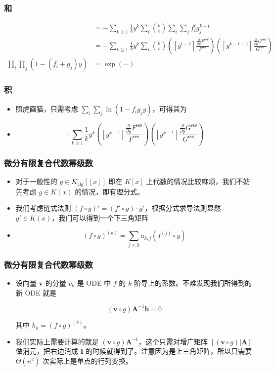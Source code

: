 \documentclass[mathserif]{ctexbeamer}
\begin{document}
\frame
{
  \frametitle{和}
  \begin{align*}
  &= - \sum_{k\ge 1} \frac 1k y^k \sum_t \binom k t  \sum_i\sum_j  f_i^t g_j^{k-t}\\
  &= - \sum_{k\ge 1} \frac 1k y^k \sum_t \binom k t \left([y^{t-1}]\frac {\frac {\partial}{\partial y}F^{\mathsf {rev}}}{F^{\mathsf {rev}}}\right)\left([y^{k-t-1}]\frac {\frac {\partial}{\partial y}G^{\mathsf {rev}}}{G^{\mathsf {rev}}}\right)\\
  \prod_i\prod_j(1-(f_i+g_j)y) &= \exp ( \cdots )
  \end{align*}
}

\frame
{
  \frametitle{积}
  \begin{itemize}
  \item<1-> 照虎画猫，只需考虑 $\sum_i \sum_j \ln (1-f_ig_j y)$，可得其为
  \item<2-> $$ - \sum_{k\ge 1} \frac 1k y^k \left([y^{k-1}]\frac {\frac {\partial}{\partial y}F^{\mathsf {rev}}}{F^{\mathsf {rev}}}\right)\left([y^{k-1}]\frac {\frac {\partial}{\partial y}G^{\mathsf {rev}}}{G^{\mathsf {rev}}}\right) $$
  \end{itemize}
}

\frame
{
  \frametitle{微分有限复合代数幂级数}
  
  \begin{itemize}
  \item<1-> 对于一般性的 $g\in K_{\mathrm{alg}}[[x]]$ 即在 $K[x]$ 上代数的情况比较麻烦，我们不妨先考虑 $g\in K(x)$ 的情况，即有理分式。

  \item<2-> 我们考虑链式法则 $(f\circ g)' = (f'\circ g) \cdot g'$，根据分式求导法则显然 $g' \in K(x)$，我们可以得到一个下三角矩阵

  \item<3->
$$
(f\circ g)^{(k)} = \sum_{j\le k} a_{k,j} (f^{(j)} \circ g)
$$
  \end{itemize}
}

\frame
{
  \frametitle{微分有限复合代数幂级数}

  \begin{itemize}
  \item<1-> 设向量 $\mathbf v$ 的分量 $v_k$ 是 ODE 中 $f$ 的 $k$ 阶导上的系数。不难发现我们所得到的新 ODE 就是

$$
(\mathbf v \circ g) \mathbf A^{-1} \mathbf h = 0
$$

其中 $h_k = (f\circ g)^{(k)}$。

  \item<2->
我们实际上需要计算的就是 $(\mathbf v \circ g) \mathbf A^{-1}$，这个只需对增广矩阵 $[(\mathbf v \circ g) | \mathbf A]$ 做消元，把右边消成 $\mathbf I$ 的时候就得到了。注意因为是上三角矩阵，所以只需要 $\Theta(n^2)$ 次实际上是单点的行列变换。
  \end{itemize}
}
\end{document}
